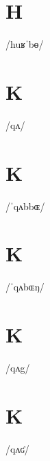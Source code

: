 \documentclass[10pt,a4paper,twoside]{book}
\begin{document}
\section*{H}

\begin{multicols}{3}
 {/huʁˈbɵ/} {}
\end{multicols}

\section*{K}

\begin{multicols}{3}
 {/qʌ/} {}
\end{multicols}

\section*{K}

\begin{multicols}{3}
 {/ˈqʌbbɶ/} {}
\end{multicols}

\section*{K}

\begin{multicols}{3}
 {/ˈqʌbɶŋ/} {}
\end{multicols}

\section*{K}

\begin{multicols}{3}
 {/qʌg/} {}
\end{multicols}

\section*{K}

\begin{multicols}{3}
 {/qʌʛ/} {}
\end{multicols}
\end{document}
